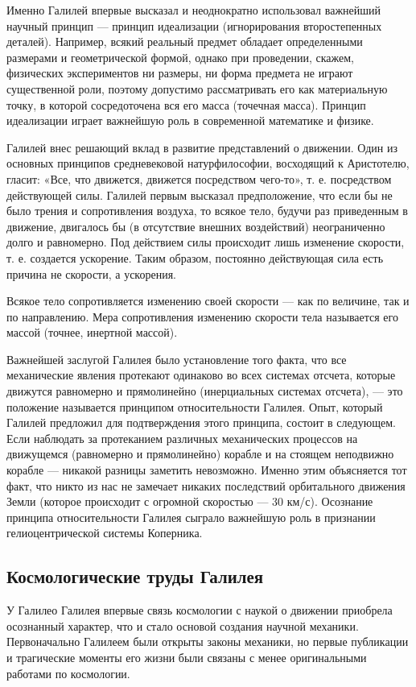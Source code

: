 \documentclass[a4paper, 14pt]{extreport}
\begin{document}
Именно Галилей впервые высказал и неоднократно использовал важнейший
научный принцип --- принцип идеализации (игнорирования второстепенных
деталей). Например, всякий реальный предмет обладает определенными
размерами и геометрической формой, однако при проведении, скажем,
физических экспериментов ни размеры, ни форма предмета не играют
существенной роли, поэтому допустимо рассматривать его как материальную
точку, в которой сосредоточена вся его масса (точечная масса). Принцип
идеализации играет важнейшую роль в современной математике и физике.

Галилей внес решающий вклад в развитие представлений о движении. Один из
основных принципов средневековой натурфилософии, восходящий к
Аристотелю, гласит: «Все, что движется, движется посредством чего-то»,
т. е. посредством действующей силы. Галилей первым высказал
предположение, что если бы не было трения и сопротивления воздуха, то
всякое тело, будучи раз приведенным в движение, двигалось бы (в
отсутствие внешних воздействий) неограниченно долго и равномерно. Под
действием силы происходит лишь изменение скорости, т. е. создается
ускорение. Таким образом, постоянно действующая сила есть причина не
скорости, а ускорения.

Всякое тело сопротивляется изменению своей скорости --- как по величине,
так и по направлению. Мера сопротивления изменению скорости тела
называется его массой (точнее, инертной массой).

Важнейшей заслугой Галилея было установление того факта, что все
механические явления протекают одинаково во всех системах отсчета,
которые движутся равномерно и прямолинейно (инерциальных системах
отсчета), --- это положение называется принципом относительности
Галилея. Опыт, который Галилей предложил для подтверждения этого
принципа, состоит в следующем. Если наблюдать за протеканием различных
механических процессов на движущемся (равномерно и прямолинейно) корабле
и на стоящем неподвижно корабле --- никакой разницы заметить невозможно.
Именно этим объясняется тот факт, что никто из нас не замечает никаких
последствий орбитального движения Земли (которое происходит с огромной
скоростью --- 30 км/с). Осознание принципа относительности Галилея
сыграло важнейшую роль в признании гелиоцентрической системы Коперника.

\subsection{Космологические труды Галилея}

У Галилео Галилея впервые связь космологии с наукой о движении приобрела
осознанный характер, что и стало основой создания научной механики.
Первоначально Галилеем были открыты законы механики, но первые
публикации и трагические моменты его жизни были связаны с менее
оригинальными работами по космологии.
\end{document}

